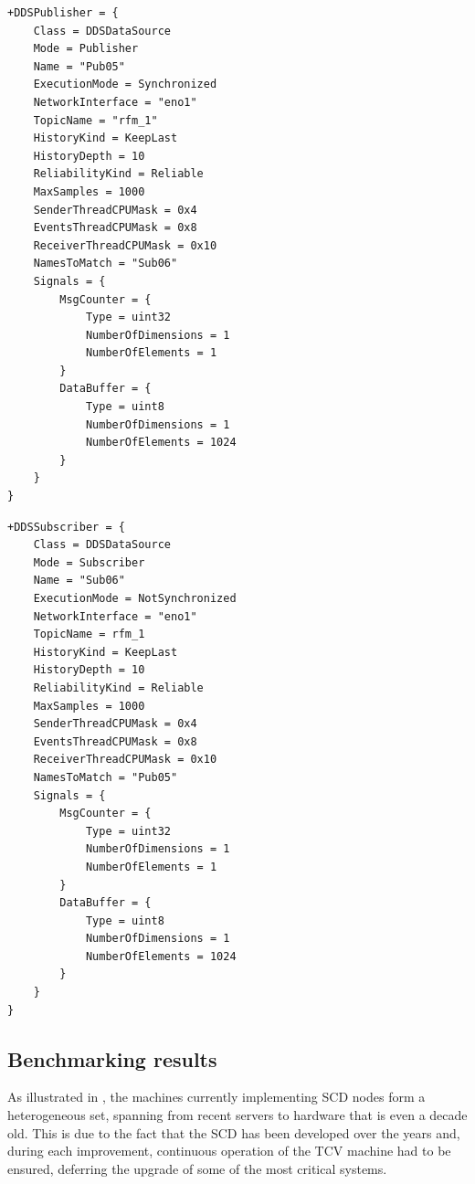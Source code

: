 \newpage
\begin{center}
\begin{minipage}[t]{.9\textwidth}
\begin{lstlisting}[caption={Sample configuration settings of a \texttt{Publisher} \texttt{DDSDataSource}.}, label={lst:ddsdatasource_pub}]
+DDSPublisher = {
    Class = DDSDataSource
    Mode = Publisher
    Name = "Pub05"
    ExecutionMode = Synchronized
    NetworkInterface = "eno1"
    TopicName = "rfm_1"
    HistoryKind = KeepLast
    HistoryDepth = 10
    ReliabilityKind = Reliable
    MaxSamples = 1000
    SenderThreadCPUMask = 0x4
    EventsThreadCPUMask = 0x8
    ReceiverThreadCPUMask = 0x10
    NamesToMatch = "Sub06"
    Signals = {
        MsgCounter = {
            Type = uint32
            NumberOfDimensions = 1
            NumberOfElements = 1
        }
        DataBuffer = {
            Type = uint8
            NumberOfDimensions = 1
            NumberOfElements = 1024
        }
    }
}
\end{lstlisting}
\end{minipage}
\end{center}

\newpage
\begin{center}
\begin{minipage}[t]{.9\textwidth}
\begin{lstlisting}[caption={Sample configuration settings of a \texttt{Subscriber} \texttt{DDSDataSource}.}, label={lst:ddsdatasource_sub}]
+DDSSubscriber = {
    Class = DDSDataSource
    Mode = Subscriber
    Name = "Sub06"
    ExecutionMode = NotSynchronized
    NetworkInterface = "eno1"
    TopicName = rfm_1
    HistoryKind = KeepLast
    HistoryDepth = 10
    ReliabilityKind = Reliable
    MaxSamples = 1000
    SenderThreadCPUMask = 0x4
    EventsThreadCPUMask = 0x8
    ReceiverThreadCPUMask = 0x10
    NamesToMatch = "Pub05"
    Signals = {
        MsgCounter = {
            Type = uint32
            NumberOfDimensions = 1
            NumberOfElements = 1
        }
        DataBuffer = {
            Type = uint8
            NumberOfDimensions = 1
            NumberOfElements = 1024
        }
    }
}
\end{lstlisting}
\end{minipage}
\end{center}

\subsection{Benchmarking results}
\label{sec:ddsdatasource_benchmark}
As illustrated in \cite{galperti_overview_2024}, the machines currently implementing SCD nodes form a heterogeneous set, spanning from recent servers to hardware that is even a decade old. This is due to the fact that the SCD has been developed over the years and, during each improvement, continuous operation of the TCV machine had to be ensured, deferring the upgrade of some of the most critical systems.

